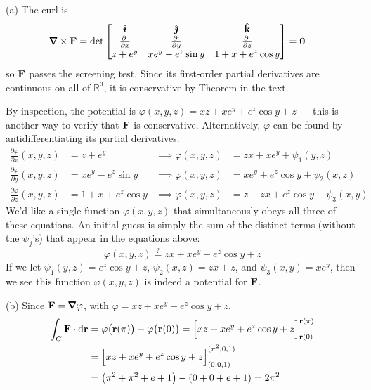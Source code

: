 \begin{solution} (a)
The curl is
\begin{align*}
\vnabla\times\vF
&=\det\left[\begin{matrix}
\hi &\hj &\hk \\
\pdiff{}{x} & \pdiff{}{y} & 
                \pdiff{}{z} \\
z+e^y & xe^y-e^z\sin y & 1+x+e^z\cos y
\end{matrix}
\right]
=\vZero
\end{align*}
so $\mathbf{F}$ passes the screening test. Since its first-order partial derivatives are continuous on all of $\mathbb R^3$, it is conservative by 
Theorem  in the  text.


By inspection, the potential is $\varphi(x,y,z)=xz+xe^y+e^z\cos y +z$
--- this is another way to verify that $\mathbf{F}$ is conservative.
Alternatively, $\varphi$ can be found 
by antidifferentiating its partial derivatives.
\begin{align*}
\frac{\partial \varphi}{\partial x}(x,y,z) &= z + e^y & \implies \varphi(x,y,z)&=zx+xe^y+\psi_1(y,z)\\
\frac{\partial \varphi}{\partial y}(x,y,z) &= xe^y - e^z \sin y & \implies \varphi(x,y,z)&=xe^y+e^z\cos y+\psi_2(x,z)\\
\frac{\partial \varphi}{\partial z}(x,y,z) &= 1 + x + e^z \cos y & \implies \varphi(x,y,z)&=z+zx+e^z\cos y+\psi_3(x,y)
\end{align*}
We'd like a single function $\varphi(x,y,z)$ that simultaneously obeys all three of these equations. 
An initial guess is simply the sum of the distinct terms (without the $\psi_j$'s) that appear in the equations above:
\[\varphi(x,y,z)\stackrel{?}{=} zx+xe^y+e^z\cos y+z \]
If we let $\psi_1(y,z)=e^z\cos y+z$, $\psi_2(x,z)=zx+z$, and $\psi_3(x,y)=xe^y$, then we see this function $\varphi(x,y,z)$ is indeed a potential for $\mathbf{F}$.



\noindent (b)
Since $\vF=\vnabla\varphi$, with $\varphi=xz+xe^y+e^z\cos y +z$,
\begin{align*}
\int_C \mathbf{F} \cdot \mathrm{d}\mathbf{r}
&=\varphi\big(\mathbf{r}(\pi)\big)-\varphi\big(\mathbf{r}(0)\big)=\Big[xz+xe^y+e^z\cos y +z\Big]_{\mathbf{r}(0)}^{\mathbf{r}(\pi)}\\
&=\Big[xz+xe^y+e^z\cos y +z\Big]_{(0,0,1)}^{(\pi^2,0,1)}\\
&=\left(\pi^2+\pi^2+e+1 \right)-\left(0+0+e+1 \right)
=2\pi^2
\end{align*}

\end{solution}

